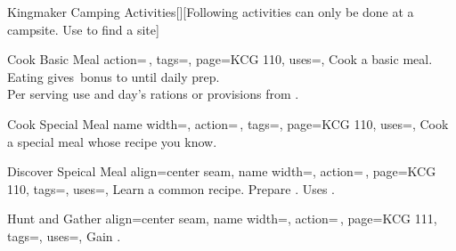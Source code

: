 \begin{PageFront}
\begin{Tables}{\frontTableHeight}
\begin{Table}{Kingmaker Camping Activities}[][Following activities can only be done at a campsite. Use
         to find a site]
\begin{entry}{Cook Basic Meal}
{                action=\,,
                tags=\Manipulate,
                page=KCG 110,
                uses={},
            }
                Cook a basic meal. Eating gives \,\Status bonus to  until daily prep.\\
                Per serving use   and  day's rations or provisions from .\\
                 \hfill {}
            \end{entry}
            \begin{entry}{Cook Special Meal}{%
                name width=\activityLength,%
                action=\,,
                tags=\Manipulate,
                page=KCG 110,
                uses={},
            }
                Cook a special meal whose recipe you know. \hfill{}
            \end{entry}
            \begin{entry}{Discover Speical Meal}{%
                align=center seam,
                name width=\activityLength,%
                action=\,,
                page=KCG 110,
                tags=\Manipulate,
                uses=,
            }
                Learn a common recipe. Prepare  . Uses . \hfill{}\\
                \hfill{} \quad {}
            \end{entry}
            \begin{entry}{Hunt and Gather}{%
                align=center seam,
                name width=\activityLength,%
                action=\,,
                page=KCG 111,
                tags=\Move,
                uses={},
            }
                Gain . \hfill
                \\

\end{entry}
\end{Table}
\end{Tables}
\end{PageFront}

